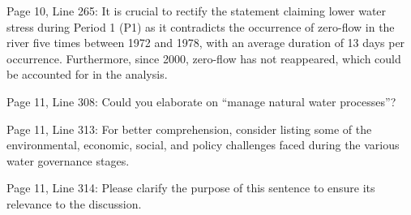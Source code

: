 \RC{} Page 10, Line 265: It is crucial to rectify the statement claiming lower water stress during Period 1 (P1) as it contradicts the occurrence of zero-flow in the river five times between 1972 and 1978, with an average duration of 13 days per occurrence. Furthermore, since 2000, zero-flow has not reappeared, which could be accounted for in the analysis.

\RC{} Page 11, Line 308: Could you elaborate on ``manage natural water processes''?

\RC{} Page 11, Line 313: For better comprehension, consider listing some of the environmental, economic, social, and policy challenges faced during the various water governance stages.

\RC{} Page 11, Line 314: Please clarify the purpose of this sentence to ensure its relevance to the discussion.
